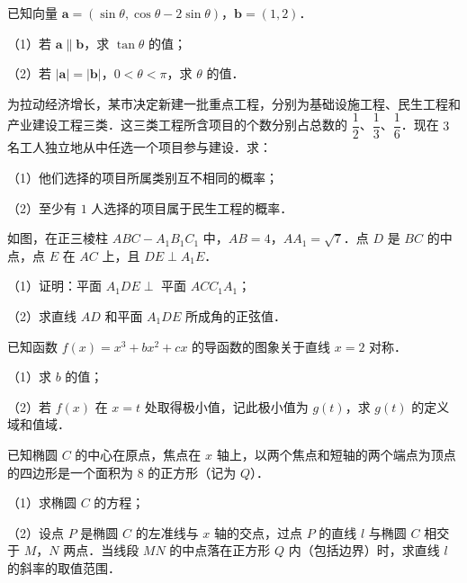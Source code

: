 \begin{question}
已知向量 $\boldsymbol a=(\sin\theta,\cos\theta-2\sin\theta)$，$\boldsymbol b=(1,2)$．

（1）若 $\boldsymbol a\parallel\boldsymbol b$，求 $\tan\theta$ 的值；

（2）若 $|\boldsymbol a|=|\boldsymbol b|$，$0<\theta<\pi$，求 $\theta$ 的值．

\end{question}
\begin{question}
为拉动经济增长，某市决定新建一批重点工程，分别为基础设施工程、民生工程和产业建设工程三类．这三类工程所含项目的个数分别占总数的 $\dfrac12$、$\dfrac13$、$\dfrac16$．现在 $3$ 名工人独立地从中任选一个项目参与建设．求：

（1）他们选择的项目所属类别互不相同的概率；

（2）至少有 $1$ 人选择的项目属于民生工程的概率．

\Needspace{0.4\textheight}
\end{question}
\begingroup
\renewenvironment{question}{\Needspace{0.5\textheight}}{}
\begin{question}
如图，在正三棱柱 $ABC-A_1B_1C_1$ 中，$AB=4$，$AA_1=\sqrt7$．点 $D$ 是 $BC$ 的中点，点 $E$ 在 $AC$ 上，且 $DE\perp A_1E$．

（1）证明：平面 $A_1DE\perp$ 平面 $ACC_1A_1$；

（2）求直线 $AD$ 和平面 $A_1DE$ 所成角的正弦值．
\nopagebreak[4]
\begin{center}\end{center}
\nopagebreak[4]
\end{question}
\endgroup
\begin{question}
已知函数 $f(x)=x^3+bx^2+cx$ 的导函数的图象关于直线 $x=2$ 对称．

（1）求 $b$ 的值；

（2）若 $f(x)$ 在 $x=t$ 处取得极小值，记此极小值为 $g(t)$，求 $g(t)$ 的定义域和值域．

\end{question}
\begin{question}
已知椭圆 $C$ 的中心在原点，焦点在 $x$ 轴上，以两个焦点和短轴的两个端点为顶点的四边形是一个面积为 $8$ 的正方形（记为 $Q$）．

（1）求椭圆 $C$ 的方程；

（2）设点 $P$ 是椭圆 $C$ 的左准线与 $x$ 轴的交点，过点 $P$ 的直线 $l$ 与椭圆 $C$ 相交于 $M$，$N$ 两点．当线段 $MN$ 的中点落在正方形 $Q$ 内（包括边界）时，求直线 $l$ 的斜率的取值范围．

\end{question}
